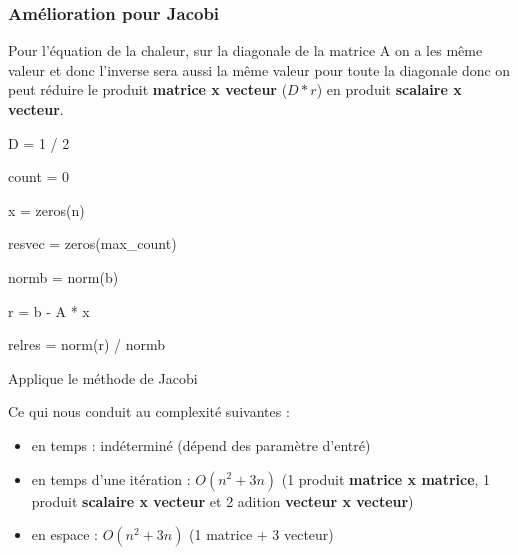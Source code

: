 \documentclass[11pt]{article}
\begin{document}
\subsubsection{Amélioration pour Jacobi}

Pour l'équation de la chaleur, sur la diagonale de la matrice A on a
les même valeur et donc l'inverse sera aussi la même valeur pour toute
la diagonale donc on peut réduire le produit \textbf{matrice x
  vecteur} ($D * r$) en produit \textbf{scalaire x vecteur}.\newline
\vspace{5mm}
\begin{algorithm} [H]
  \SetAlgoLined

  D = 1 / 2 

  count = 0 

  x = zeros(n) 

  resvec = zeros(max\_count) 

  normb = norm(b) 

  r = b - A * x 

  relres = norm(r) / normb 


  \caption{Applique le méthode de Jacobi}
\end{algorithm}
\vspace{5mm}
Ce qui nous conduit au complexité suivantes :

\begin{itemize}
\item en temps : indéterminé (dépend des paramètre d'entré)
\item en temps d'une itération : $O(n^2 + 3n)$ (1 produit \textbf{matrice x
  matrice}, 1 produit \textbf{scalaire x vecteur} et 2 adition
  \textbf{vecteur x vecteur})
\item en espace : $O(n^2 + 3n)$ (1 matrice + 3 vecteur)
\end{itemize}
\end{document}
